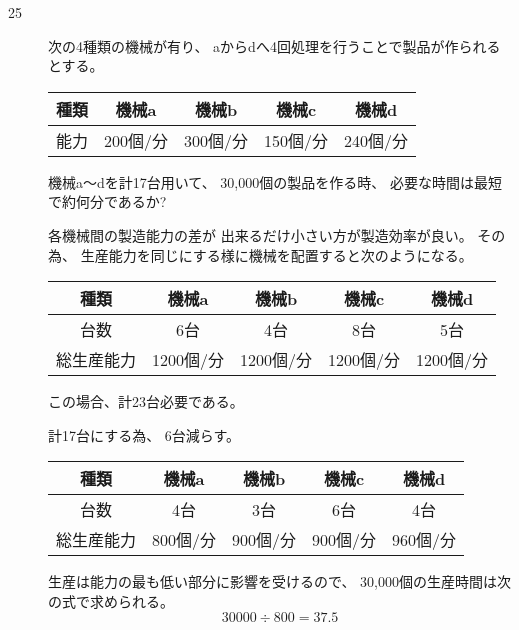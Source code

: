 \documentclass[12pt,b5paper]{ltjsarticle}
\begin{document}
\hrulefill

\begin{description}
 \item[25]
            次の4種類の機械が有り、
            aからdへ4回処理を行うことで製品が作られるとする。
            \begin{tabular}{|c||c|c|c|c|}
             \hline
             種類 & 機械a & 機械b & 機械c & 機械d \\
             \hline
             能力 & 200個/分 & 300個/分 & 150個/分 & 240個/分 \\
             \hline
            \end{tabular}

            機械a～dを計17台用いて、
            30,000個の製品を作る時、
            必要な時間は最短で約何分であるか?

            \dotfill

            各機械間の製造能力の差が
            出来るだけ小さい方が製造効率が良い。
            その為、
            生産能力を同じにする様に機械を配置すると次のようになる。

            \begin{tabular}{|c|c|c|c|c|}
             \hline
             種類 & 機械a & 機械b & 機械c & 機械d \\
             \hline
             台数 & 6台 & 4台 & 8台 & 5台 \\
             \hline
             総生産能力 & 1200個/分 & 1200個/分 & 1200個/分 & 1200個/分 \\
             \hline
            \end{tabular}

            この場合、計23台必要である。

            計17台にする為、
            6台減らす。

            \begin{tabular}{|c|c|c|c|c|}
             \hline
             種類 & 機械a & 機械b & 機械c & 機械d \\
             \hline
             台数 & 4台 & 3台 & 6台 & 4台 \\
             \hline
             総生産能力 & 800個/分 & 900個/分 & 900個/分 & 960個/分 \\
             \hline
            \end{tabular}

            生産は能力の最も低い部分に影響を受けるので、
            30,000個の生産時間は次の式で求められる。
            \begin{equation}
             30000 \div 800 = 37.5
            \end{equation}


\end{description}
\end{document}
